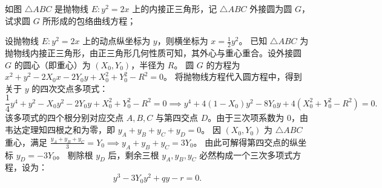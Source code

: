 \begin{example}
如图 $\triangle ABC$ 是抛物线 $E: y^2 = 2x$ 上的内接正三角形，记 $\triangle ABC$ 外接圆为圆 $G$，试求圆 $G$ 所形成的包络曲线方程；
\end{example}
\begin{solution}
设抛物线 $E: y^2 = 2x$ 上的动点纵坐标为 $y$，则横坐标为 $x = \frac{1}{2}y^2$。
已知 $\triangle ABC$ 为抛物线内接正三角形，由正三角形几何性质可知，其外心与重心重合。设外接圆 $G$ 的圆心（即重心）为 $(X_0, Y_0)$，半径为 $R$。
圆 $G$ 的方程为 $x^2 + y^2 - 2X_0 x - 2Y_0 y + X_0^2 + Y_0^2 - R^2 = 0$。
将抛物线方程代入圆方程中，得到关于 $y$ 的四次交点多项式：
\[
\frac{1}{4}y^4 + y^2 - X_0 y^2 - 2Y_0 y + X_0^2 + Y_0^2 - R^2 = 0 \implies y^4 + 4(1 - X_0)y^2 - 8Y_0 y + 4(X_0^2 + Y_0^2 - R^2) = 0.
\]
该多项式的四个根分别对应交点 $A, B, C$ 与第四交点 $D$。由于三次项系数为 $0$，由韦达定理知四根之和为零，即 $y_A + y_B + y_C + y_D = 0$。
因 $(X_0, Y_0)$ 为 $\triangle ABC$ 重心，满足 $\frac{y_A + y_B + y_C}{3} = Y_0 \implies y_A + y_B + y_C = 3Y_0$。
由此可解得第四交点的纵坐标 $y_D = -3Y_0$。
剔除根 $y_D$ 后，剩余三根 $y_A, y_B, y_C$ 必然构成一个三次多项式方程，设为：
\[
y^3 - 3Y_0 y^2 + qy - r = 0.
\]


\end{solution}
